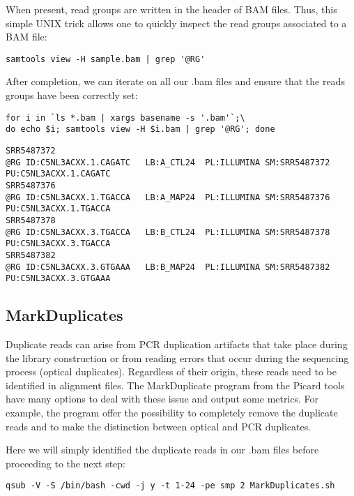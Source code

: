 When present, read groups are written in the header of BAM files. Thus, this simple UNIX trick allows one to quickly inspect the read groups associated to a BAM file:

\begin{verbatim}
samtools view -H sample.bam | grep '@RG'	
\end{verbatim}

After completion, we can iterate on all our .bam files and ensure that the reads groups have been correctly set:

\begin{verbatim}
for i in `ls *.bam | xargs basename -s '.bam'`;\
do echo $i; samtools view -H $i.bam | grep '@RG'; done
\end{verbatim}

\begin{verbatim}
SRR5487372
@RG	ID:C5NL3ACXX.1.CAGATC	LB:A_CTL24	PL:ILLUMINA	SM:SRR5487372	PU:C5NL3ACXX.1.CAGATC
SRR5487376
@RG	ID:C5NL3ACXX.1.TGACCA	LB:A_MAP24	PL:ILLUMINA	SM:SRR5487376	PU:C5NL3ACXX.1.TGACCA
SRR5487378
@RG	ID:C5NL3ACXX.3.TGACCA	LB:B_CTL24	PL:ILLUMINA	SM:SRR5487378	PU:C5NL3ACXX.3.TGACCA
SRR5487382
@RG	ID:C5NL3ACXX.3.GTGAAA	LB:B_MAP24	PL:ILLUMINA	SM:SRR5487382	PU:C5NL3ACXX.3.GTGAAA
\end{verbatim}





\subsection{MarkDuplicates}


Duplicate reads can arise from PCR duplication artifacts that take place during the library construction or from reading errors that occur during the sequencing process (optical duplicates). Regardless of their origin, these reads need to be identified in alignment files. The MarkDuplicate program from the Picard tools have many options to deal with these issue and output some metrics. For example, the program offer the possibility to completely remove the duplicate reads and to make the distinction between optical and PCR duplicates.

Here we will simply identified the duplicate reads in our .bam files before proceeding to the next step:

\begin{verbatim}
qsub -V -S /bin/bash -cwd -j y -t 1-24 -pe smp 2 MarkDuplicates.sh
\end{verbatim}


